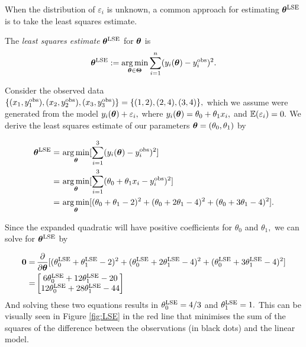 When the distribution of $\varepsilon_i$ is unknown, a common approach for
estimating $\bm{\theta}^{\mathrm{LSE}}$ is to take the least squares estimate.

\begin{definition}
    The \emph{least squares estimate} $\bm{\theta}^{\mathrm{LSE}}$ for
    $\bm{\theta}$ is
    $$
        \bm{\theta}^{\mathrm{LSE}}
        := \operatorname*{arg\,min}_{\bm{\theta}\in\mathbf{\Theta}}
        \sum_{i = 1}^n (y_i(\bm{\theta})- y_i^{\mathrm{obs}})^2.
    $$
\end{definition}

\begin{example}\label{ex:LSE}
    Consider the observed data
    $\{(x_1, y_1^{\mathrm{obs}}), (x_2, y_2^{\mathrm{obs}}), (x_3, y_3^{\mathrm{obs}})\}
        = \{(1, 2), (2, 4), (3, 4)\},$
    which we assume were generated from the model
    $y_i(\bm{\theta}) + \varepsilon_i,$ where
    $y_i(\bm{\theta}) = \theta_0 + \theta_1x_i,$ and
    $\operatorname{\mathbb{E}}(\varepsilon_i) = 0.$ We derive the least squares estimate of our
    parameters $\bm{\theta} = (\theta_0, \theta_1)$ by

    \begin{align*}
        \bm{\theta}^{\mathrm{LSE}}
        = & \, \operatorname*{arg\,min}_{\bm{\theta}}
        [\sum_{i = 1}^3 (y_i(\bm{\theta}) - y_i^{\mathrm{obs}})^2]           \\
        = & \, \operatorname*{arg\,min}_{\bm{\theta}}
        [\sum_{i = 1}^3 (\theta_0 + \theta_1x_i - y_i^{\mathrm{obs}})^2] \\
        = & \, \operatorname*{arg\,min}_{\bm{\theta}}
        [(\theta_0 + \theta_1 - 2)^2 + (\theta_0 + 2\theta_1 - 4)^2
            + (\theta_0 + 3\theta_1 - 4)^2].
    \end{align*}

    Since the expanded quadratic will have positive coefficients for
    $\theta_0$ and $\theta_1,$ we can solve for $\bm{\theta}^{\mathrm{LSE}}$
    by

    \begin{align*}
        \mathbf{0}
        = & \, \frac{\partial}{\partial \bm{\theta}}
        [
            (\theta^{\mathrm{LSE}}_0 + \theta^{\mathrm{LSE}}_1 - 2)^2
            + (\theta^{\mathrm{LSE}}_0 + 2\theta^{\mathrm{LSE}}_1 - 4)^2
            + (\theta^{\mathrm{LSE}}_0 + 3\theta^{\mathrm{LSE}}_1 - 4)^2
        ]                                        \\
        = & \begin{bmatrix}
                6\theta^{\mathrm{LSE}}_0 + 12\theta^{\mathrm{LSE}}_1 - 20 \\
                12\theta^{\mathrm{LSE}}_0 + 28\theta^{\mathrm{LSE}}_1 - 44
            \end{bmatrix}
    \end{align*}
    And solving these two equations results in $\theta^{\mathrm{LSE}}_0 = 4/3$ and
    $\theta^{\mathrm{LSE}}_1 = 1.$ This can be visually seen in Figure \ref{fig:LSE} in
    the red line that minimises the sum of the squares of the difference
    between the observations (in black dots) and the linear model.
\end{example}



